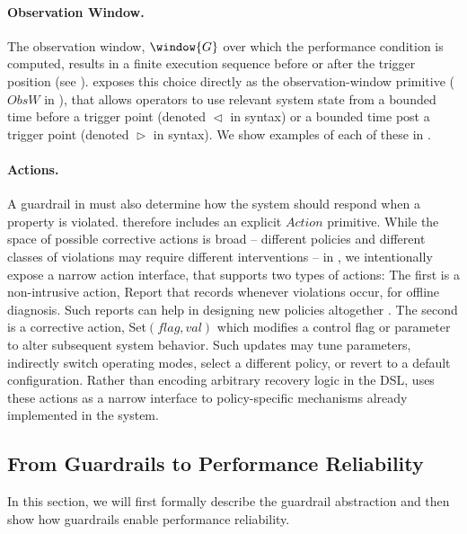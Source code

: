 \paragraph{Observation Window.}
The observation window, $\window{G}$ over which the performance condition is computed, results in a finite execution sequence before or after the trigger position (see ).
\lang exposes this choice directly as the observation-window primitive ($ObsW$ in ), that allows operators to use relevant system state from a bounded time before a trigger point (denoted $\vartriangleleft$ in \lang syntax) or a bounded time post a trigger point (denoted $\vartriangleright$ in \lang syntax).
We show examples of each of these in .

\paragraph{Actions.}
A guardrail in \lang must also determine how the system should respond when a property is violated. \lang therefore includes an explicit $Action$ primitive.
While the space of possible corrective actions is broad -- different policies and different classes of violations may require different interventions -- in \lang, we intentionally expose a narrow action interface, that supports two types of actions:
The first is a non-intrusive action, \textsf{Report} that records whenever violations occur, for offline diagnosis. Such reports can help in designing new policies altogether .
The second is a corrective action, \textsf{Set}$(flag, val)$ which modifies a control flag or parameter to alter subsequent system behavior.
Such updates may tune parameters, indirectly switch operating modes, select a different policy, or revert to a default configuration.
Rather than encoding arbitrary recovery logic in the DSL, \lang uses these actions as a narrow interface to policy-specific mechanisms already implemented in the system.


\subsection{From Guardrails to Performance Reliability}\label{subsec:formal-basis}



In this section, we will first formally describe the guardrail abstraction and then show how guardrails enable performance reliability.

